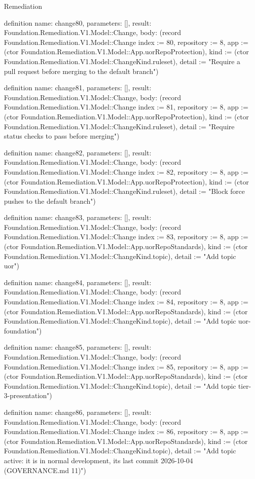 \begin{lexlean}{Remediation}
\begin{semanticmodule}
definition{
  name: change80,
  parameters: [],
  result: Foundation.Remediation.V1.Model::Change,
  body: (record Foundation.Remediation.V1.Model::Change {index := 80, repository := 8, app := (ctor Foundation.Remediation.V1.Model::App.uorRepoProtection), kind := (ctor Foundation.Remediation.V1.Model::ChangeKind.ruleset), detail := "Require a pull request before merging to the default branch"})
}

definition{
  name: change81,
  parameters: [],
  result: Foundation.Remediation.V1.Model::Change,
  body: (record Foundation.Remediation.V1.Model::Change {index := 81, repository := 8, app := (ctor Foundation.Remediation.V1.Model::App.uorRepoProtection), kind := (ctor Foundation.Remediation.V1.Model::ChangeKind.ruleset), detail := "Require status checks to pass before merging"})
}

definition{
  name: change82,
  parameters: [],
  result: Foundation.Remediation.V1.Model::Change,
  body: (record Foundation.Remediation.V1.Model::Change {index := 82, repository := 8, app := (ctor Foundation.Remediation.V1.Model::App.uorRepoProtection), kind := (ctor Foundation.Remediation.V1.Model::ChangeKind.ruleset), detail := "Block force pushes to the default branch"})
}

definition{
  name: change83,
  parameters: [],
  result: Foundation.Remediation.V1.Model::Change,
  body: (record Foundation.Remediation.V1.Model::Change {index := 83, repository := 8, app := (ctor Foundation.Remediation.V1.Model::App.uorRepoStandards), kind := (ctor Foundation.Remediation.V1.Model::ChangeKind.topic), detail := "Add topic uor"})
}

definition{
  name: change84,
  parameters: [],
  result: Foundation.Remediation.V1.Model::Change,
  body: (record Foundation.Remediation.V1.Model::Change {index := 84, repository := 8, app := (ctor Foundation.Remediation.V1.Model::App.uorRepoStandards), kind := (ctor Foundation.Remediation.V1.Model::ChangeKind.topic), detail := "Add topic uor-foundation"})
}

definition{
  name: change85,
  parameters: [],
  result: Foundation.Remediation.V1.Model::Change,
  body: (record Foundation.Remediation.V1.Model::Change {index := 85, repository := 8, app := (ctor Foundation.Remediation.V1.Model::App.uorRepoStandards), kind := (ctor Foundation.Remediation.V1.Model::ChangeKind.topic), detail := "Add topic tier-3-presentation"})
}

definition{
  name: change86,
  parameters: [],
  result: Foundation.Remediation.V1.Model::Change,
  body: (record Foundation.Remediation.V1.Model::Change {index := 86, repository := 8, app := (ctor Foundation.Remediation.V1.Model::App.uorRepoStandards), kind := (ctor Foundation.Remediation.V1.Model::ChangeKind.topic), detail := "Add topic active: it is in normal development, its last commit 2026-10-04 (GOVERNANCE.md 11)"})
}


\end{semanticmodule}
\end{lexlean}
